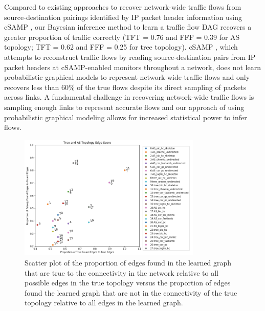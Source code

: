 \documentclass[conference]{IEEEtran}
\begin{document}
Compared to existing approaches to recover network-wide traffic flows from source-destination pairings identified by IP packet header information using cSAMP \cite{b19}, our Bayesian inference method to learn a traffic flow DAG recovers a greater proportion of traffic correctly (TFT = 0.76 and FFF = 0.39 for AS topology; TFT = 0.62 and FFF = 0.25 for tree topology). cSAMP \cite{b19}, which attempts to reconstruct traffic flows by reading source-destination pairs from IP packet headers at cSAMP-enabled monitors throughout a network, does not learn probabilistic graphical models to represent network-wide traffic flows and only recovers less than 60\% of the true flows despite its direct sampling of packets across links. A fundamental challenge in recovering network-wide traffic flows is sampling enough links to represent accurate flows and our approach of using probabilistic graphical modeling allows for increased statistical power to infer flows.

\begin{figure}[h!]
\centering
    \includegraphics[height=6cm]{images/edge_scores.png}
    \caption{Scatter plot of the proportion of edges found in the learned graph that are true to the connectivity in the network relative to all possible edges in the true topology versus the proportion of edges found the learned graph that are not in the connectivity of the true topology relative to all edges in the learned graph. 
}
\label{fig:edges}
\end{figure}
\end{document}
